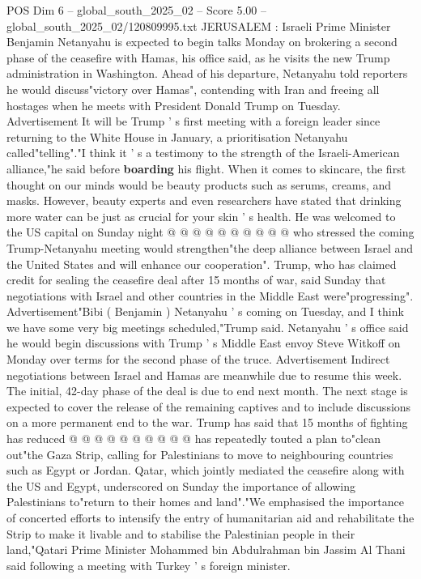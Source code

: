 \begin{textsample}{POS Dim 6 – global\_south\_2025\_02 – Score 5.00 – global\_south\_2025\_02/120809995.txt}  \label{ex:f6_pos_407}
JERUSALEM : Israeli Prime Minister Benjamin Netanyahu is expected to begin talks Monday on brokering a second phase of the ceasefire with Hamas, his office said, as he visits the new Trump administration in Washington.
Ahead of his departure, Netanyahu told reporters he would discuss"victory over Hamas", contending with Iran and freeing all hostages when he meets with President Donald Trump on Tuesday.
Advertisement It will be Trump ' s first meeting with a foreign leader since returning to the White House in January, a prioritisation Netanyahu called"telling"."I think it ' s a testimony to the strength of the Israeli-American alliance,"he said before \textbf{boarding} his flight.
When it comes to skincare, the first thought on our minds would be beauty products such as serums, creams, and masks.
However, beauty experts and even researchers have stated that drinking more water can be just as crucial for your skin ' s health.
He was welcomed to the US capital on Sunday night @ @ @ @ @ @ @ @ @ @ who stressed the coming Trump-Netanyahu meeting would strengthen"the deep alliance between Israel and the United States and will enhance our cooperation".
Trump, who has claimed credit for sealing the ceasefire deal after 15 months of war, said Sunday that negotiations with Israel and other countries in the Middle East were"progressing".
Advertisement"Bibi ( Benjamin ) Netanyahu ' s coming on Tuesday, and I think we have some very big meetings scheduled,"Trump said.
Netanyahu ' s office said he would begin discussions with Trump ' s Middle East envoy Steve Witkoff on Monday over terms for the second phase of the truce.
Advertisement Indirect negotiations between Israel and Hamas are meanwhile due to resume this week.
The initial, 42-day phase of the deal is due to end next month.
The next stage is expected to cover the release of the remaining captives and to include discussions on a more permanent end to the war.
Trump has said that 15 months of fighting has reduced @ @ @ @ @ @ @ @ @ @ has repeatedly touted a plan to"clean out"the Gaza Strip, calling for Palestinians to move to neighbouring countries such as Egypt or Jordan.
Qatar, which jointly mediated the ceasefire along with the US and Egypt, underscored on Sunday the importance of allowing Palestinians to"return to their homes and land"."We emphasised the importance of concerted efforts to intensify the entry of humanitarian aid and rehabilitate the Strip to make it livable and to stabilise the Palestinian people in their land,"Qatari Prime Minister Mohammed bin Abdulrahman bin Jassim Al Thani said following a meeting with Turkey ' s foreign minister.

\end{textsample}
